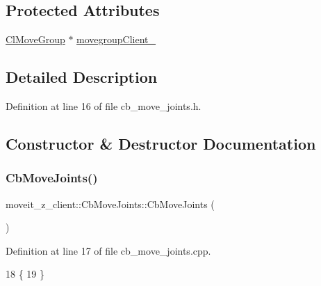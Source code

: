 \subsection*{Protected Attributes}
\begin{DoxyCompactItemize}
\item 
\hyperlink{classmoveit__z__client_1_1ClMoveGroup}{Cl\+Move\+Group} $\ast$ \hyperlink{classmoveit__z__client_1_1CbMoveJoints_a2ce2e613b676025766dcd2f01ae50810}{movegroup\+Client\+\_\+}
\end{DoxyCompactItemize}


\subsection{Detailed Description}


Definition at line 16 of file cb\+\_\+move\+\_\+joints.\+h.



\subsection{Constructor \& Destructor Documentation}
\mbox{\label{classmoveit__z__client_1_1CbMoveJoints_a8d9f24fd96baa202c546654f3e92f51c}} 
\subsubsection{\texorpdfstring{Cb\+Move\+Joints()}{CbMoveJoints()}\hspace{0.1cm}{\footnotesize\ttfamily [1/2]}}
{\footnotesize\ttfamily moveit\+\_\+z\+\_\+client\+::\+Cb\+Move\+Joints\+::\+Cb\+Move\+Joints (\begin{DoxyParamCaption}{ }\end{DoxyParamCaption})}



Definition at line 17 of file cb\+\_\+move\+\_\+joints.\+cpp.


\begin{DoxyCode}
18 \{
19 \}
\end{DoxyCode}
\mbox{\label{classmoveit__z__client_1_1CbMoveJoints_ae0f43ac05e5263161541eb6bc15fa457}} 
